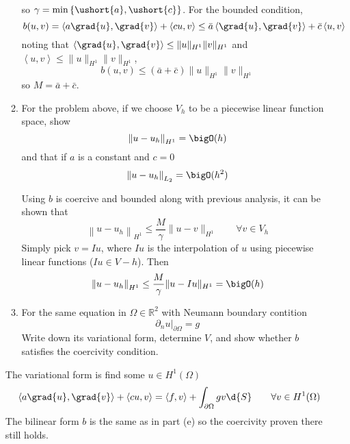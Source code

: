 \documentclass{article}
\newcommand\NoIndent[1]{%
  \begingroup
  \par
  \parshape0
  #1\par
  \endgroup
}
\begin{document}
\begin{enumerate}
\begin{enumerate}
{\begin{equation*}
	\end{equation*}
	so $\gamma = \min\left\{\ushort{a},\ushort{c}\right\}$.
	For the bounded condition,
	\begin{equation*}
		b(u,v) = \left<a\grad{u},\grad{v}\right> + \left<cu,v\right> \leq
			\bar{a}\left<\grad{u},\grad{v}\right> + \bar{c}\left<u,v\right>
	\end{equation*}
	noting that $\left<\grad{u},\grad{v}\right> \leq \|u\|_{H^1}\|v\|_{H^1}$
	and $\left<u,v\right> \leq \|u\|_{H^1}\|v\|_{H^1}$,
	\begin{equation*}
		b(u,v) \leq \left(\bar{a}+\bar{c}\right)\|u\|_{H^1}\|v\|_{H^1}
	\end{equation*}
	so $M = \bar{a}+\bar{c}$.
}
			\item For the problem above, if we choose $V_h$ to be a piecewise linear function space, show
				\begin{equation*}
					\left\|u - u_h\right\|_{H^1} = \bigO(h)
				\end{equation*}
				and that if $a$ is a constant and $c = 0$
				\begin{equation*}
					\left\|u - u_h\right\|_{L_2} = \bigO(h^2)
				\end{equation*}
\NoIndent{
	Using $b$ is coercive and bounded along with previous analysis, it can be shown that
	\begin{equation*}
		\left\|u - u_h\right\|_{H^1} \leq \frac{M}{\gamma}\|u - v\|_{H^1} \qquad \forall v \in V_h
	\end{equation*}
	Simply pick $v = Iu$, where $Iu$ is the interpolation of $u$
	using piecewise linear functions ($Iu \in V-h$).
	Then
	\begin{equation*}
		\left\|u - u_h\right\|_{H^1} \leq \frac{M}{\gamma}\|u - Iu\|_{H^1} = \bigO(h)
	\end{equation*}
}
			\item For the same equation in $\Omega \in \mathbb{R}^2$ with Neumann boundary contition
				\begin{equation*}
					\left.\partial_n u\right|_{\partial\Omega} = g
				\end{equation*}
				Write down its variational form, determine $V$,
				and show whether $b$ satisfies the coercivity condition.
		\end{enumerate}
\NoIndent{
	The variational form is find some $u \in H^1(\Omega)$
	\begin{equation*}
		\left<a\grad{u},\grad{v}\right> + \left<cu,v\right> = \left<f,v\right> + \int_{\partial\Omega}gv\d{S} \qquad \forall v \in H^1(\Omega)
	\end{equation*}
	The bilinear form $b$ is the same as in part (e) so the coercivity proven there still holds.
}


\end{enumerate}
\end{document}
